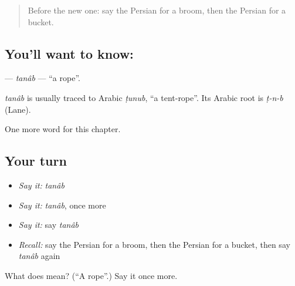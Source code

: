 \begin{quote}
Before the new one: say the Persian for a broom, then the Persian for a bucket.
\end{quote}

\subsection*{You'll want to know: }
\textbf{} — \emph{tanâb} — \textquotedblleft{}a rope\textquotedblright{}.

\begin{cousinweb}
\emph{tanâb} is usually traced to Arabic \emph{ṭunub}, \textquotedblleft{}a tent-rope\textquotedblright{}. Its Arabic root is \emph{ṭ-n-b} (Lane).
\end{cousinweb}

\begin{grammarlens}[title={What you've built}]
One more word for this chapter.
\end{grammarlens}

\subsection*{Your turn}
\begin{itemize}
\raggedright
  \item \emph{Say it:} \emph{tanâb}
  \item \emph{Say it:} \emph{tanâb}, once more
  \item \emph{Say it:} say \emph{tanâb}
  \item \emph{Recall:} say the Persian for a broom, then the Persian for a bucket, then say \emph{tanâb} again
\end{itemize}

\begin{tcolorbox}[breakable,colback=teal!4,colframe=teal!35!black,title={Before you move on}]
What does  mean? (\textquotedblleft{}A rope\textquotedblright{}.) Say it once more.
\end{tcolorbox}
